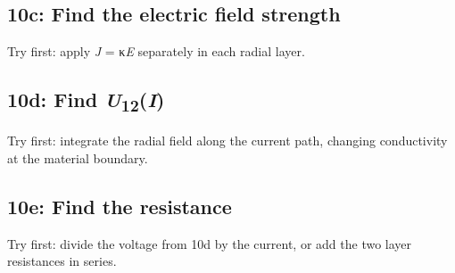 \documentclass[11pt]{article}
\begin{document}
\begin{keepsection}
\begin{keepsection}
\subsection{10c: Find the electric field strength}

Try first: apply \textit{J} = κ\textit{E} separately in each radial layer.

\end{keepsection}

\begin{keepsection}
\subsection{10d: Find \textit{U}\textsubscript{12}(\textit{I})}

Try first: integrate the radial field along the current path, changing conductivity at the material boundary.

\end{keepsection}

\begin{keepsection}
\subsection{10e: Find the resistance}

Try first: divide the voltage from 10d by the current, or add the two layer resistances in series.

\end{keepsection}
\end{keepsection}


\clearpage
\end{document}
